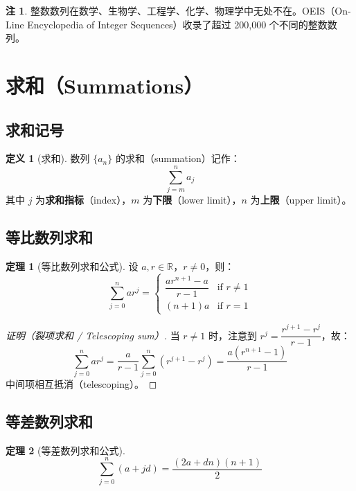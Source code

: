 \documentclass[UTF8,11pt,a4paper]{ctexbook}   %
\theoremstyle{definition}
\newtheorem{definition}{定义}[section]
\newtheorem{theorem}{定理}[section]
\newtheorem{remark}{注}[section]
\begin{document}
\begin{remark}
整数数列在数学、生物学、工程学、化学、物理学中无处不在。OEIS（On-Line Encyclopedia of Integer Sequences）收录了超过 200,000 个不同的整数数列。
\end{remark}

\section{求和（Summations）}

\subsection{求和记号}

\begin{definition}[求和]
数列 $\{a_n\}$ 的求和（summation）记作：
\[
\sum_{j=m}^{n} a_j
\]
其中 $j$ 为\textbf{求和指标}（index），$m$ 为\textbf{下限}（lower limit），$n$ 为\textbf{上限}（upper limit）。
\end{definition}

\subsection{等比数列求和}

\begin{theorem}[等比数列求和公式]
设 $a, r \in \mathbb{R}$，$r \neq 0$，则：
\[
\sum_{j=0}^{n} ar^j = \begin{cases}
\dfrac{ar^{n+1}-a}{r-1} & \text{if } r \neq 1 \\[1em]
(n+1)a & \text{if } r = 1
\end{cases}
\]
\end{theorem}

\begin{proof}[证明（裂项求和 / Telescoping sum）]
当 $r \neq 1$ 时，注意到 $r^j = \dfrac{r^{j+1}-r^j}{r-1}$，故：
\[
\sum_{j=0}^{n} ar^j = \frac{a}{r-1}\sum_{j=0}^{n}(r^{j+1}-r^j) = \frac{a(r^{n+1}-1)}{r-1}
\]
中间项相互抵消（telescoping）。
\end{proof}

\subsection{等差数列求和}

\begin{theorem}[等差数列求和公式]
\[
\sum_{j=0}^{n}(a+jd) = \frac{(2a+dn)(n+1)}{2}
\]
\end{theorem}
\end{document}
